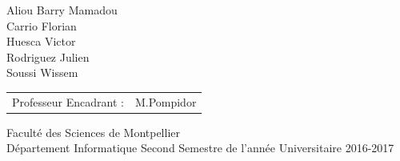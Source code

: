 \begin{titlepage}
\begin{center}
    
    {\huge Aliou Barry Mamadou} \\[0.2cm]
    {\huge Carrio Florian} \\[0.2cm]
    {\huge Huesca Victor} \\[0.2cm]
    {\huge Rodriguez Julien}\\[0.2cm]
    {\huge Soussi Wissem} \\[1cm]
    
    \begin{tabular}[hc]{>{\huge}l >{\huge}l}
      Professeur Encadrant : & M.Pompidor 
    \end{tabular}
    
    \vfill  %
    
    \Large 
    {
        Faculté des Sciences de Montpellier\\
        Département Informatique
        Second Semestre de l'année Universitaire 2016-2017
    }
     
    \end{center}
\end{titlepage}